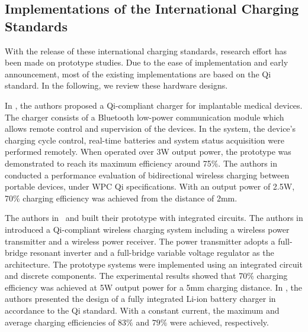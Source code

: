\documentclass[twocolumn,10pt]{IEEEtran}
\begin{document}
\subsection{Implementations of the International Charging Standards}


With the release of these international charging standards, research effort has been made on prototype studies. 
Due to the ease of implementation and early announcement, most of the existing implementations are based on the Qi standard. In the following, we review these hardware designs.   

In \cite{S2014Hached}, the authors proposed a Qi-compliant charger for implantable medical devices. The charger consists of a Bluetooth low-power communication module which allows remote control and supervision of the devices. In the system, the device's charging cycle control, real-time batteries and system status acquisition were performed remotely. When operated over 3W output power, the prototype was demonstrated to reach its maximum efficiency around 75$\%$. The authors in~\cite{S2013Miura} conducted a performance evaluation of bidirectional wireless charging between portable devices, under WPC Qi specifications. With an output power of 2.5W, 70$\%$ charging efficiency was achieved from the distance of 2mm. 

The authors in~\cite{M2013Galizzi} and \cite{V.2015Quang} built their prototype with integrated circuits. The authors in \cite{M2013Galizzi} introduced a Qi-compliant wireless charging system including a wireless power transmitter and a wireless power receiver. The power transmitter adopts a full-bridge resonant inverter and a full-bridge variable voltage regulator as the architecture. The prototype systems were implemented using an integrated circuit and discrete components. The experimental results showed that 70$\%$ charging efficiency was achieved at 5W output power for a 5mm charging distance. In \cite{V.2015Quang}, the authors presented the design of a fully integrated Li-ion battery charger in accordance to the Qi standard. With a constant current, the maximum and average charging efficiencies of $83\%$ and $79\%$ were achieved, respectively.
\end{document}
